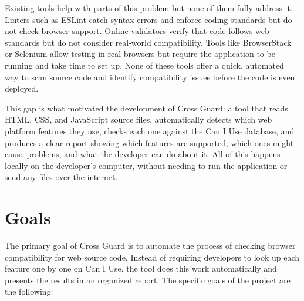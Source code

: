 Existing tools help with parts of this problem but none of them fully address it. Linters such as ESLint catch syntax errors and enforce coding standards but do not check browser support. Online validators verify that code follows web standards but do not consider real-world compatibility. Tools like BrowserStack or Selenium allow testing in real browsers but require the application to be running and take time to set up. None of these tools offer a quick, automated way to scan source code and identify compatibility issues before the code is even deployed.

This gap is what motivated the development of Cross Guard: a tool that reads HTML, CSS, and JavaScript source files, automatically detects which web platform features they use, checks each one against the Can I Use database, and produces a clear report showing which features are supported, which ones might cause problems, and what the developer can do about it. All of this happens locally on the developer's computer, without needing to run the application or send any files over the internet.

\newpage

\section{Goals}
\label{sec:goals}

The primary goal of Cross Guard is to automate the process of checking browser compatibility for web source code. Instead of requiring developers to look up each feature one by one on Can I Use, the tool does this work automatically and presents the results in an organized report. The specific goals of the project are the following:


